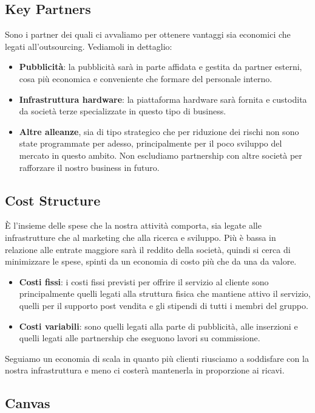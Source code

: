 \subsection{Key Partners}
Sono i partner dei quali ci avvaliamo per ottenere vantaggi sia economici che legati all'out\-sourcing. Vediamoli in dettaglio:
\begin{itemize}
\item \textbf{Pubblicità}: la pubblicità sarà in parte affidata e gestita da partner esterni, cosa più economica e conveniente che formare del personale interno.
\item \textbf{Infrastruttura hardware}: la piattaforma hardware sarà fornita e custodita da società terze specializzate in questo tipo di business.	
\item \textbf{Altre alleanze}, sia di tipo strategico che per riduzione dei rischi non sono state programmate per adesso, principalmente per il poco sviluppo del mercato in questo ambito. Non escludiamo partnership con altre società per rafforzare il nostro business in futuro.
\end{itemize}

\subsection{Cost Structure}
È l'insieme delle spese che la nostra attività comporta, sia legate alle infrastrutture che al marketing che alla ricerca e sviluppo. Più è bassa in relazione alle entrate maggiore sarà il reddito della società, quindi si cerca di minimizzare le spese, spinti da un economia di costo più che da una da valore.
\begin{itemize}
\item \textbf{Costi fissi}: i costi fissi previsti per offrire il servizio al cliente sono principalmente quelli legati alla struttura fisica che mantiene attivo il servizio, quelli per il supporto post vendita e gli stipendi di tutti i membri del gruppo.
\item \textbf{Costi variabili}: sono quelli legati alla parte di pubblicità, alle inserzioni e quelli legati alle partnership che eseguono lavori su commissione.
\end{itemize}

Seguiamo un economia di scala in quanto più clienti riusciamo a soddisfare con la nostra infrastruttura e meno ci costerà mantenerla in proporzione ai ricavi. 

\newpage

\subsection{Canvas}

